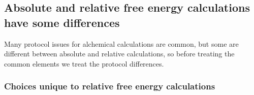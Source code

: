 \documentclass[9pt,bestpractices]{livecoms}
\begin{document}
\subsection*{Absolute and relative free energy calculations have some differences}
Many protocol issues for alchemical calculations are common, but some are different between absolute and relative calculations, so before treating the common elements we treat the protocol differences.



\subsubsection*{Choices unique to relative free energy calculations}
\end{document}
